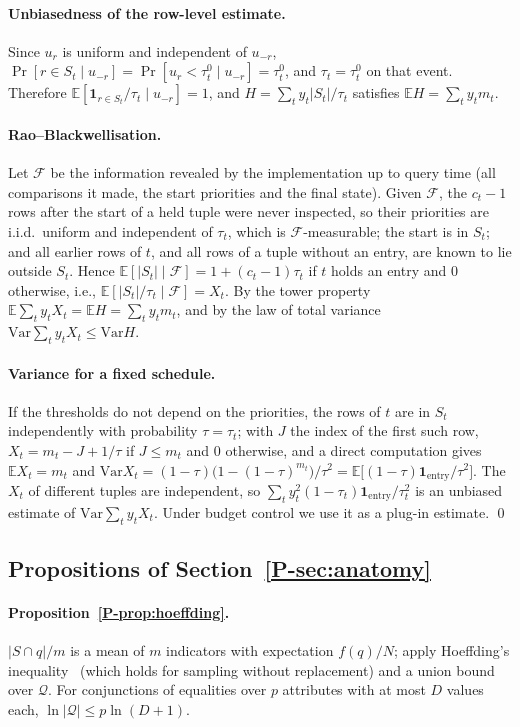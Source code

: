 \documentclass[sigconf,review,anonymous]{acmart}
\newcommand{\E}{\mathbb{E}}
\newcommand{\Var}{\mathrm{Var}}
\newcommand{\pref}[1]{\ref{P-#1}}
\begin{document}
\paragraph{Unbiasedness of the row-level estimate.} Since $u_r$ is uniform and independent of $u_{-r}$,
$\Pr[r\in S_t\mid u_{-r}]=\Pr[u_r<\tau^0_t\mid u_{-r}]=\tau^0_t$, and $\tau_t=\tau^0_t$ on that event.
Therefore $\E[\mathbf 1_{r\in S_t}/\tau_t\mid u_{-r}]=1$, and $H=\sum_ty_t|S_t|/\tau_t$ satisfies
$\E H=\sum_ty_tm_t$.

\paragraph{Rao--Blackwellisation.} Let $\mathcal F$ be the information revealed by the implementation up
to query time (all comparisons it made, the start priorities and the final state). Given $\mathcal F$, the
$c_t-1$ rows after the start of a held tuple were never inspected, so their priorities are i.i.d.\
uniform and independent of $\tau_t$, which is $\mathcal F$-measurable; the start is in $S_t$; and all
earlier rows of $t$, and all rows of a tuple without an entry, are known to lie outside $S_t$. Hence
$\E[|S_t|\mid\mathcal F]=1+(c_t-1)\tau_t$ if $t$ holds an entry and $0$ otherwise, i.e.,
$\E[|S_t|/\tau_t\mid\mathcal F]=X_t$. By the tower property $\E\sum_ty_tX_t=\E H=\sum_ty_tm_t$, and by the
law of total variance $\Var\sum_ty_tX_t\le\Var H$.

\paragraph{Variance for a fixed schedule.} If the thresholds do not depend on the priorities, the rows of
$t$ are in $S_t$ independently with probability $\tau=\tau_t$; with $J$ the index of the first such row,
$X_t=m_t-J+1/\tau$ if $J\le m_t$ and $0$ otherwise, and a direct computation gives $\E X_t=m_t$ and
$\Var X_t=(1-\tau)\bigl(1-(1-\tau)^{m_t}\bigr)/\tau^2=\E\bigl[(1-\tau)\mathbf 1_{\text{entry}}/\tau^2\bigr]$.
The $X_t$ of different tuples are independent, so $\sum_ty_t^2(1-\tau_t)\mathbf 1_{\text{entry}}/\tau_t^2$
is an unbiased estimate of $\Var\sum_ty_tX_t$. Under budget control we use it as a plug-in estimate.
\qed

\subsection{Propositions of Section~\pref{sec:anatomy}}

\paragraph{Proposition~\pref{prop:hoeffding}.} $|S\cap q|/m$ is a mean of $m$ indicators with expectation
$f(q)/N$; apply Hoeffding's inequality~\cite{hoeffding} (which holds for sampling without replacement) and
a union bound over $\mathcal Q$. For conjunctions of equalities over $p$ attributes with at most $D$ values
each, $\ln|\mathcal Q|\le p\ln(D+1)$.
\end{document}
